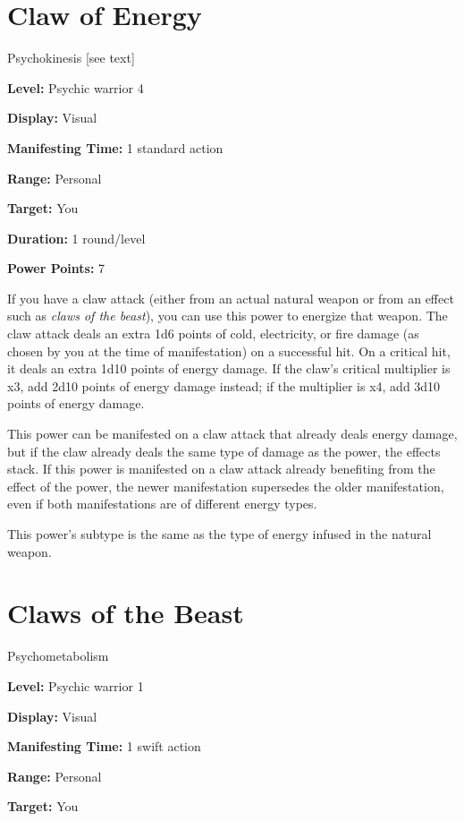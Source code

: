 \documentclass{article}
\begin{document}
\vspace{12pt}
\section*{Claw of Energy}

Psychokinesis [see text]

\textbf{Level:} Psychic warrior 4

\textbf{Display:} Visual

\textbf{Manifesting Time:} 1 standard action

\textbf{Range:} Personal

\textbf{Target:} You

\textbf{Duration:} 1 round/level

\textbf{Power Points:} 7

If you have a claw attack (either from an actual natural weapon or from an effect 
such as \textit{claws of the beast}), you can use this power to energize that weapon. 
The claw attack deals an extra 1d6 points of cold, electricity, or fire damage 
(as chosen by you at the time of manifestation) on a successful hit. On a critical 
hit, it deals an extra 1d10 points of energy damage. If the claw's critical multiplier 
is x3, add 2d10 points of energy damage instead; if the multiplier is x4, add 3d10 
points of energy damage.

This power can be manifested on a claw attack that already deals energy damage, 
but if the claw already deals the same type of damage as the power, the effects 
stack. If this power is manifested on a claw attack already benefiting from the 
effect of the power, the newer manifestation supersedes the older manifestation, 
even if both manifestations are of different energy types.

This power's subtype is the same as the type of energy infused in the natural weapon.

\vspace{12pt}
\section*{Claws of the Beast}

Psychometabolism

\textbf{Level:} Psychic warrior 1

\textbf{Display:} Visual

\textbf{Manifesting Time:} 1 swift action

\textbf{Range:} Personal

\textbf{Target:} You
\end{document}
